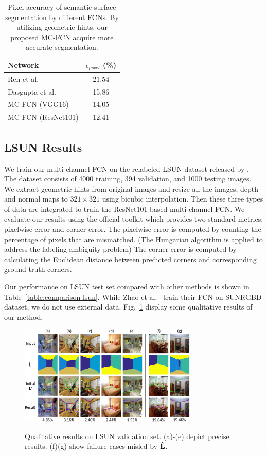 \begin{table}
	\centering
	\begin{tabular}{lc}
		\toprule
		Network & $\epsilon_{pixel}$ (\%)\\
		\midrule
		Ren et al.~\cite{ren2016coarse} & 21.54 \\
		Dasgupta et al.~\cite{dasgupta2016delay} & 15.86 \\  
		\midrule
		MC-FCN (VGG16)  & 14.05 \\
		MC-FCN (ResNet101) & 12.41 \\
		\bottomrule
	\end{tabular}
	\caption{Pixel accuracy of semantic surface segmentation by different FCNs. By utilizing geometric hints, our proposed MC-FCN acquire more accurate segmentation. }	
	\label{table:ablation}
\end{table}

\subsection{LSUN Results}
\label{sec:LSUN}
We train our multi-channel FCN on the relabeled LSUN dataset released by \cite{ren2016coarse}. The dataset consists of 4000 training, 394 validation, and 1000 testing images. We extract geometric hints from original images and resize all the images, depth and normal maps to $321\times321$ using bicubic interpolation. Then these three types of data are integrated to train the ResNet101 based multi-channel FCN. We evaluate our results using the official toolkit which provides two standard metrics: pixelwise error and corner error. The pixelwise error is computed by counting the percentage of pixels that are mismatched. (The Hungarian algorithm is applied to address the labeling ambiguity problem) The corner error is computed by calculating the Euclidean distance between predicted corners and corresponding ground truth corners.

Our performance on LSUN test set compared with other methods is shown in Table~\ref{table:comparison-lsun}. While Zhao et al.~\cite{zhao2017physics} train their FCN on SUNRGBD dataset, we do not use external data. Fig.~\ref{fig:qualitative} display some qualitative results of our method. 

\begin{figure}[!ht]
	\centering
	\textsc{\includegraphics[width=8.5cm]{figure/qualitive.png}}
	\caption{Qualitative results on LSUN validation set. (a)-(e) depict precise results. (f)(g) show failure cases misled by $\mathbf{\hat{L}}$. }
	\label{fig:qualitative}
\end{figure}

